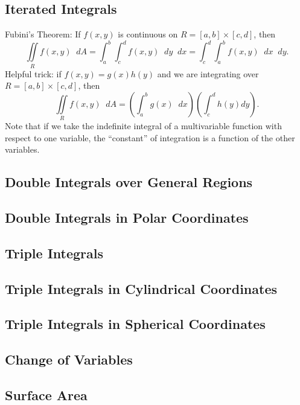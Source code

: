 \documentclass[12pt]{article}
\newcommand{\dd}{\mathop{}\!d}
\theoremstyle{definition}
\begin{document}
\subsection{Iterated Integrals}
Fubini's Theorem: If $f(x, y)$ is continuous on $R = [a, b] \times [c, d]$, then \begin{equation*}
  \iint\limits_R f(x,y) \dd A = \int_a^b\int_c^d f(x,y) \dd y \dd x = \int_c^d\int_a^b f(x, y) \dd x \dd y.
\end{equation*}
Helpful trick: if $f(x, y) = g(x)h(y)$ and we are integrating over $R = [a,b] \times [c, d]$, then \begin{equation*}
  \iint\limits_R f(x,y) \dd A = \left( \int_a^b g(x) \dd x \right) \left( \int_c^d h(y) dy \right).
\end{equation*}
Note that if we take the indefinite integral of a multivariable function with respect to one variable, the ``constant'' of integration is a function of the other variables.

\subsection{Double Integrals over General Regions}

\subsection{Double Integrals in Polar Coordinates}

\subsection{Triple Integrals}

\subsection{Triple Integrals in Cylindrical Coordinates}

\subsection{Triple Integrals in Spherical Coordinates}

\subsection{Change of Variables}

\subsection{Surface Area}
\end{document}
